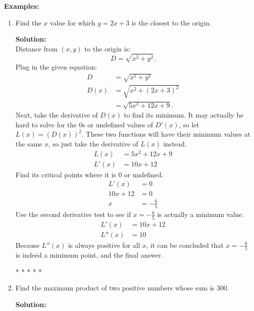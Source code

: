 \documentclass[12pt]{article}
\begin{document}
\noindent \textbf{Examples:}
\begin{enumerate}
	\item Find the $x$ value for which $y=2x+3$ is the closest to the origin.

	      \noindent \textbf{Solution:}
	      \\ Distance from $(x, y)$ to the origin is:
	      \[ D = \sqrt{x^2 + y^2}. \]
	      Plug in the given equation:
	      \begin{align*}
		      D    & = \sqrt{x^2 + y^2}       \\
		      D(x) & = \sqrt{x^2 + (2x+3)^2}  \\
		      & = \sqrt{5x^2 + 12x + 9}.
	      \end{align*}
	      Next, take the derivative of $D(x)$ to find its minimum. It may actually be hard to solve for the $0$s or undefined values of $D'(x)$, so let $L(x) = \left( D(x) \right )^2$. These two functions will have their minimum values at the same $x$, so just take the derivative of $L(x)$ instead.
	      \begin{align*}
		      L(x)  & = 5x^2 + 12x + 9 \\
		      L'(x) & = 10x + 12
	      \end{align*}
	      Find its critical points where it is $0$ or undefined.
	      \begin{align*}
		      L'(x)    & = 0            \\
		      10x + 12 & = 0            \\
		      x        & = -\frac{6}{5}
	      \end{align*}
	      Use the second derivative test to see if $x=-\frac{6}{5}$ is actually a minimum value.
	      \begin{align*}
		      L'(x)  & = 10x + 12 \\
		      L''(x) & = 10
	      \end{align*}
	      Because $L''(x)$ is always positive for all $x$, it can be concluded that $x=-\frac{6}{5}$ is indeed a minimum point, and the final answer.

	      \begin{center}
		      * * * * *
	      \end{center}

	\item Find the maximum product of two positive numbers whose sum is $300$.

	      \noindent \textbf{Solution:}


\end{enumerate}
\end{document}
